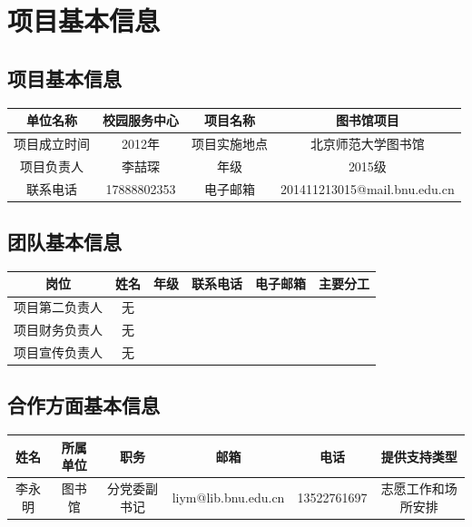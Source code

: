 \documentclass[nocover]{lizhechen}
\begin{document}
	\section{项目基本信息}
	\subsection{项目基本信息}
	
	\begin{table}[H]
		\begin{center}
		\begin{tabular}{|c|c|c|c|}
			\hline
			单位名称 & 校园服务中心 & 项目名称 &  图书馆项目 \\
			\hline
			项目成立时间 & 2012年 & 项目实施地点 & 北京师范大学图书馆 \\
			\hline
			项目负责人 & 李喆琛 & 年级 & 2015级 \\
			\hline
			联系电话 & 17888802353 & 电子邮箱 & 201411213015@mail.bnu.edu.cn \\
			\hline
		\end{tabular}
		\end{center}
	\end{table}
	
	\subsection{团队基本信息}
	
	\begin{table}[H]
		\begin{center}
			\begin{tabular}{|c|c|c|c|c|c|}
				\hline
				岗位 & 姓名 & 年级 & 联系电话 & 电子邮箱 & 主要分工\\
				\hline
				项目第二负责人 & 无 & \ & \ & \ & \ \\
				\hline
				项目财务负责人 & 无 & \ & \ & \ & \ \\
				\hline
				项目宣传负责人 & 无 & \ & \ & \ & \ \\
				\hline
				
			\end{tabular}
		\end{center}
	\end{table}
	
	\subsection{合作方面基本信息}
	\begin{table}[H]
		\begin{center}
			\begin{tabular}{|c|c|c|c|c|c|}
				\hline
				姓名 & 所属单位 & 职务 & 邮箱 & 电话 & 提供支持类型 \\
				\hline
				李永明 & 图书馆 & 分党委副书记 & liym@lib.bnu.edu.cn & 13522761697 & 志愿工作和场所安排 \\
				\hline
			\end{tabular}
		\end{center}
	\end{table}
	
\end{document}
